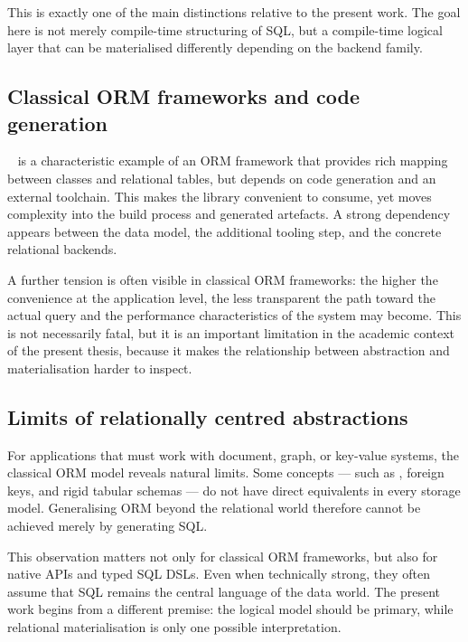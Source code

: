 This is exactly one of the main distinctions relative to the present work. The goal here is not merely compile-time structuring of SQL, but a compile-time logical layer that can be materialised differently depending on the backend family.

\subsection{Classical ORM frameworks and code generation}

~\cite{odb} is a characteristic example of an ORM framework that provides rich mapping between classes and relational tables, but depends on code generation and an external toolchain. This makes the library convenient to consume, yet moves complexity into the build process and generated artefacts. A strong dependency appears between the data model, the additional tooling step, and the concrete relational backends.

A further tension is often visible in classical ORM frameworks: the higher the convenience at the application level, the less transparent the path toward the actual query and the performance characteristics of the system may become. This is not necessarily fatal, but it is an important limitation in the academic context of the present thesis, because it makes the relationship between abstraction and materialisation harder to inspect.

\subsection{Limits of relationally centred abstractions}

For applications that must work with document, graph, or key-value systems, the classical ORM model reveals natural limits. Some concepts --- such as , foreign keys, and rigid tabular schemas --- do not have direct equivalents in every storage model. Generalising ORM beyond the relational world therefore cannot be achieved merely by generating SQL.

This observation matters not only for classical ORM frameworks, but also for native APIs and typed SQL DSLs. Even when technically strong, they often assume that SQL remains the central language of the data world. The present work begins from a different premise: the logical model should be primary, while relational materialisation is only one possible interpretation.

